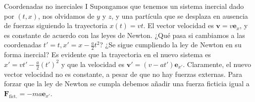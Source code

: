 \begin{example}
    {Coordenadas no inerciales I}
    \label{ex.1-galileo_noinercial_I}
    Supongamos que tenemos un sistema inercial dado por \((t, x)\), nos olvidamos de \(y\) y \(z\), y una partícula que se desplaza en ausencia de fuerzas siguiendo la trayectoria \(x(t) = vt\). El vector velocidad es \(\mathbf{v} = v\mathbf{e}_x\), y es constante de acuerdo con las leyes de Newton. ¿Qué pasa si cambiamos a las coordenadas \(t' = t, x' = x-\frac{a}{2} t^2\)? ¿Se sigue cumpliendo la ley de Newton en su forma inercial? Es evidente que la trayectoria en el nuevo sistema es \(x' = vt'- \frac{a}{2}(t')^2\) y que la velocidad es \(\mathbf{v}' = \left(v - at'\right)\mathbf{e}_{x'}\). Claramente, el nuevo vector velocidad no es constante, a pesar de que no hay fuerzas externas. Para forzar que la ley de Newton se cumpla debemos añadir una fuerza ficticia igual a \(\mathbf{F}_\mathrm{fict.} = -m a \mathbf{e}_{x'}\).
\end{example}

